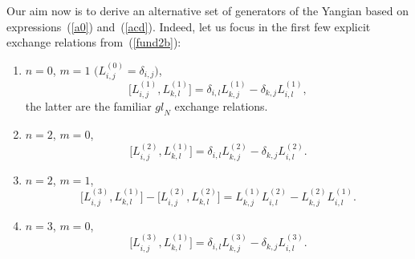 \documentclass[10pt,a4paper]{amsart}
\numberwithin{equation}{section}
\theoremstyle{definition}
\def\mathfrak#1{#1}%
\def\mathcal#1{#1}%
\begin{document}
Our aim now is to derive an alternative set of generators of the Yangian
based on expressions~(\ref{a0}) and~(\ref{acd}).
Indeed, let us focus in the first few explicit exchange relations from~(\ref{fund2b}):
\begin{enumerate}\itemsep=0pt
\item $n=0$, $m=1$ $\bigl(L_{i,j}^{(0)} = \delta_{i,j}\bigr)$,
\begin{equation*}
\bigl[ L_{i,j}^{(1)}, L_{k,l}^{(1)}\bigr] = \delta_{i,l} L_{k,j}^{(1)} -\delta_{k,j} L_{i,l}^{(1)},
\end{equation*}
the latter are the familiar ${\mathfrak gl}_{\mathcal N}$ exchange relations.
\item $n=2$, $m=0$,
\begin{equation*}
\bigl[L_{i,j}^{(2)}, L_{k,l}^{(1)}\bigr] =\delta_{i,l} L_{k,j}^{(2)} - \delta_{k,j} L_{i,l}^{(2)}.
\end{equation*}

\item $n=2$, $m=1$,
\begin{equation*}
\bigl[ L_{i,j}^{(3)}, L_{k,l}^{(1)}\bigr] -\bigl[ L_{i,j}^{(2)}, L_{k,l}^{(2)}\bigr] =
L_{k,j}^{(1)} L_{i,l}^{(2)} - L_{k,j}^{(2)} L_{i,l}^{(1)}.
\end{equation*}

\item $n=3$, $m=0$,
\begin{equation*}
\bigl[L_{i,j}^{(3)}, L_{k,l}^{(1)}\bigr] =\delta_{i,l} L_{k,j}^{(3)} - \delta_{k,j} L_{i,l}^{(3)}.
\end{equation*}
\end{enumerate}
\end{document}

